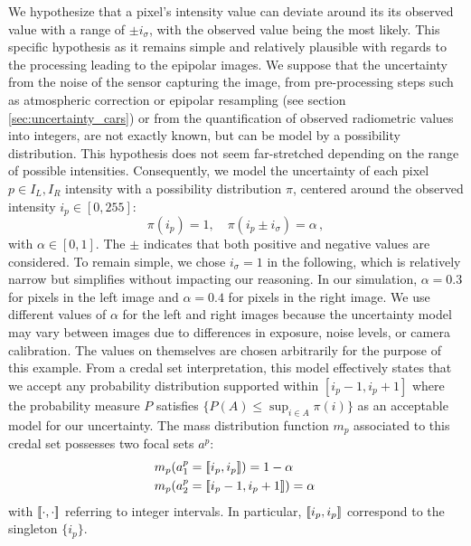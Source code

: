 We hypothesize that a pixel's intensity value can deviate around its its observed value with a range of $\pm i_\sigma$, with the observed value being the most likely. This specific hypothesis as it remains simple and relatively plausible with regards to the processing leading to the epipolar images. We suppose that the uncertainty from the noise of the sensor capturing the image, from pre-processing steps such as atmospheric correction or epipolar resampling (see section \ref{sec:uncertainty_cars}) or from the quantification of observed radiometric values into integers, are not exactly known, but can be model by a possibility distribution. This hypothesis does not seem far-stretched depending on the range of possible intensities. Consequently, we model the uncertainty of each pixel $p\in I_L,I_R$ intensity with a possibility distribution $\pi$, centered around the observed intensity $i_p\in[0,255]$:
\begin{equation}
    \pi(i_p)=1,\quad \pi(i_p\pm i_\sigma)=\alpha\,,
\end{equation}\label{eq:pixel_possibility}
with $\alpha \in [0,1]$. The $\pm$ indicates that both positive and negative values are considered. To remain simple, we chose $i_\sigma=1$ in the following, which is relatively narrow but simplifies without impacting our reasoning. In our simulation, $\alpha = 0.3$ for pixels in the left image and $\alpha = 0.4$ for pixels in the right image. We use different values of $\alpha$ for the left and right images because the uncertainty model may vary between images due to differences in exposure, noise levels, or camera calibration. The values on themselves are chosen arbitrarily for the purpose of this example. From a credal set interpretation, this model effectively states that we accept any probability distribution supported within $[i_p - 1, i_p + 1]$ where the probability measure $P$ satisfies $\{P(A) \leq \sup_{i \in A} \pi(i)\}$ as an acceptable model for our uncertainty. The mass distribution function $m_p$ associated to this credal set possesses two focal sets $a^p$:
\begin{eqnarray}
    &m_p(a^p_1={[\![} i_p, i_p{]\!]})=1-\alpha\,\nonumber\\
    &m_p(a^p_2={[\![} i_p-1, i_p + 1{]\!]})=\alpha\,\label{eq:pixel_mass}
\end{eqnarray}
with ${[\![}\cdot, \cdot{]\!]}$ referring to integer intervals. In particular, ${[\![} i_p, i_p{]\!]}$ correspond to the singleton $\{i_p\}$.

